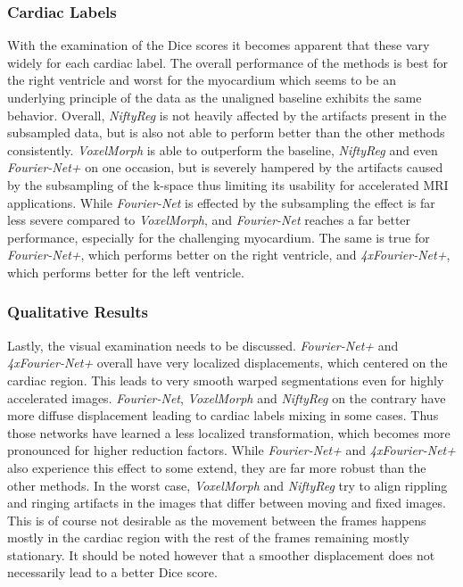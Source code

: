 \subsubsection{Cardiac Labels}
With the examination of the Dice scores it becomes apparent that these vary widely for each cardiac label. The overall performance of the methods is best for the right ventricle and worst for the myocardium which seems to be an underlying principle of the data as the unaligned baseline exhibits the same behavior. Overall, \emph{NiftyReg} is not heavily affected by the artifacts present in the subsampled data, but is also not able to perform better than the other methods consistently. \emph{VoxelMorph} is able to outperform the baseline, \emph{NiftyReg} and even \emph{Fourier-Net+} on one occasion, but is severely hampered by the artifacts caused by the subsampling of the k-space thus limiting its usability for accelerated MRI applications. While \emph{Fourier-Net} is effected by the subsampling the effect is far less severe compared to \emph{VoxelMorph}, and \emph{Fourier-Net} reaches a far better performance, especially for the challenging myocardium. The same is true for \emph{Fourier-Net+}, which performs better on the right ventricle, and \emph{4xFourier-Net+}, which performs better for the left ventricle. 

\subsubsection{Qualitative Results}
Lastly, the visual examination needs to be discussed. \emph{Fourier-Net+} and \emph{4xFourier-Net+} overall have very localized displacements, which centered on the cardiac region. This leads to very smooth warped segmentations even for highly accelerated images. \emph{Fourier-Net}, \emph{VoxelMorph} and \emph{NiftyReg} on the contrary have more diffuse displacement leading to cardiac labels mixing in some cases. Thus those networks have learned a less localized transformation, which becomes more pronounced for higher reduction factors. While \emph{Fourier-Net+} and \emph{4xFourier-Net+} also experience this effect to some extend, they are far more robust than the other methods. In the worst case, \emph{VoxelMorph} and \emph{NiftyReg} try to align rippling and ringing artifacts in the images that differ between moving and fixed images. This is of course not desirable as the movement between the frames happens mostly in the cardiac region with the rest of the frames remaining mostly stationary. It should be noted however that a smoother displacement does not necessarily lead to a better Dice score. 


